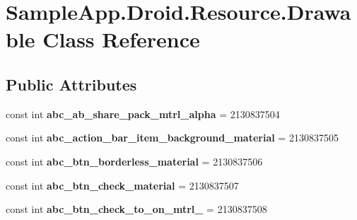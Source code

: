 \hypertarget{class_sample_app_1_1_droid_1_1_resource_1_1_drawable}{}\section{Sample\+App.\+Droid.\+Resource.\+Drawable Class Reference}
\label{class_sample_app_1_1_droid_1_1_resource_1_1_drawable}
\subsection*{Public Attributes}
\begin{DoxyCompactItemize}
\item 
\mbox{\label{class_sample_app_1_1_droid_1_1_resource_1_1_drawable_ac84054b6b9cecbad6610dc75f32adc0b}} 
const int {\bfseries abc\+\_\+ab\+\_\+share\+\_\+pack\+\_\+mtrl\+\_\+alpha} = 2130837504
\item 
\mbox{\label{class_sample_app_1_1_droid_1_1_resource_1_1_drawable_a323af281f639cce6864d66a5d662e18e}} 
const int {\bfseries abc\+\_\+action\+\_\+bar\+\_\+item\+\_\+background\+\_\+material} = 2130837505
\item 
\mbox{\label{class_sample_app_1_1_droid_1_1_resource_1_1_drawable_a4d110897789836379fd90d010331d61e}} 
const int {\bfseries abc\+\_\+btn\+\_\+borderless\+\_\+material} = 2130837506
\item 
\mbox{\label{class_sample_app_1_1_droid_1_1_resource_1_1_drawable_ae6b6cf29a4def3de0ce949ab46c167bb}} 
const int {\bfseries abc\+\_\+btn\+\_\+check\+\_\+material} = 2130837507
\item 
\mbox{\label{class_sample_app_1_1_droid_1_1_resource_1_1_drawable_a8b51964f7f4d4b8a9a51797c26a30aae}} 
const int {\bfseries abc\+\_\+btn\+\_\+check\+\_\+to\+\_\+on\+\_\+mtrl\+\_} = 2130837508
\item 
\mbox{\label{class_sample_app_1_1_droid_1_1_resource_1_1_drawable_abf0cd07af7fbbec811053072b192b711}} 

\end{DoxyCompactItemize}
